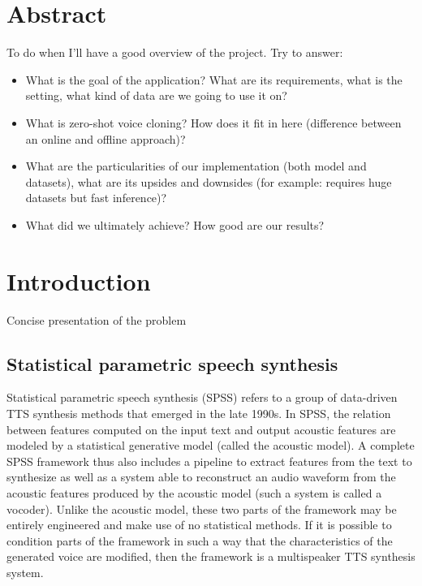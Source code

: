 \documentclass[a4paper, oneside]{article}
\begin{document}
\section{Abstract}
\color{red}
To do when I'll have a good overview of the project. Try to answer:
\begin{itemize}
	\item What is the goal of the application? What are its requirements, what is the setting, what kind of data are we going to use it on?
	\item What is zero-shot voice cloning? How does it fit in here (difference between an online and offline approach)?
	\item What are the particularities of our implementation (both model and datasets), what are its upsides and downsides (for example: requires huge datasets but fast inference)?
	\item What did we ultimately achieve? How good are our results?
\end{itemize}
\color{black}

\section{Introduction}

\color{red}
Concise presentation of the problem
\color{black}


\subsection{Statistical parametric speech synthesis}
Statistical parametric speech synthesis (SPSS) refers to a group of data-driven TTS synthesis methods that emerged in the late 1990s. In SPSS, the relation between features computed on the input text and output acoustic features are modeled by a statistical generative model (called the acoustic model). A complete SPSS framework thus also includes a pipeline to extract features from the text to synthesize as well as a system able to reconstruct an audio waveform from the acoustic features produced by the acoustic model (such a system is called a vocoder). Unlike the acoustic model, these two parts of the framework may be entirely engineered and make use of no statistical methods. If it is possible to condition parts of the framework in such a way that the characteristics of the generated voice are modified, then the framework is a multispeaker TTS synthesis system.
\end{document}

